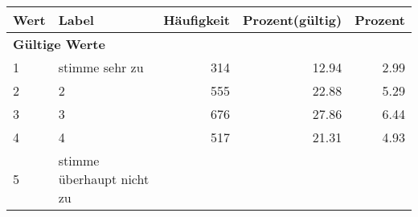      \begin{longtable}{lXrrr}
     \toprule
     \textbf{Wert} & \textbf{Label} & \textbf{Häufigkeit} & \textbf{Prozent(gültig)} & \textbf{Prozent} \\
     \endhead
     \midrule
     \multicolumn{5}{l}{\textbf{Gültige Werte}}\\

     1 &
     \multicolumn{1}{X}{ stimme sehr zu   } &


       \num{314} &
       \num[round-mode=places,round-precision=2]{12,94} &
         \num[round-mode=places,round-precision=2]{2,99} \\

     2 &
     \multicolumn{1}{X}{ 2   } &


       \num{555} &
       \num[round-mode=places,round-precision=2]{22,88} &
         \num[round-mode=places,round-precision=2]{5,29} \\

     3 &
     \multicolumn{1}{X}{ 3   } &


       \num{676} &
       \num[round-mode=places,round-precision=2]{27,86} &
         \num[round-mode=places,round-precision=2]{6,44} \\

     4 &
     \multicolumn{1}{X}{ 4   } &


       \num{517} &
       \num[round-mode=places,round-precision=2]{21,31} &
         \num[round-mode=places,round-precision=2]{4,93} \\

     5 &
     \multicolumn{1}{X}{ stimme überhaupt nicht zu   } &



\end{longtable}
